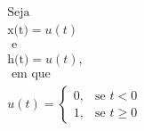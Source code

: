 \documentclass[preview]{standalone}
\begin{document}
\begin{align*}
\text{Seja } \\ \text{x(t)} = u(t) \\ \text{ e } \\ \text{h(t)} = u(t),\\ \text{ em que } \\ u(t) = \begin{cases} 0, & \text{se } t < 0 \\ 1, & \text{se } t \geq 0 \end{cases}
\end{align*}
\end{document}
